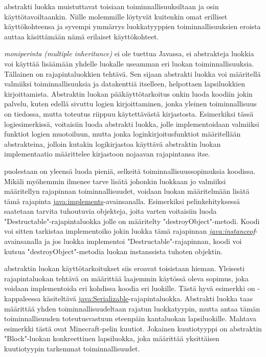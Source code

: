 \documentclass{tufte-book}
\newcommand{\eng}[1]{\textit{(#1)}}
\newcommand{\new}[1]{\textit{\gls{#1}}}
\newcommand{\neweng}[2]{\new{#1} \eng{#2}}
\newcommand{\java}[1]{\underline{\gls{java:#1}}}
\newcommand{\newjava}[1]{\textit{\java{#1}}}
\begin{document}
 abstrakti luokka muistuttavat toisiaan toiminnallisuuksiltaan ja
osin käyttötavoiltaankin. Niille molemmille löytyvät kuitenkin omat erilliset käyttökohteensa ja
syvempi ymmärrys luokkatyyppien toiminnallisuuksien eroista auttaa käsittämään nämä erilaiset
käyttökohteet.

 \neweng{moniperinta}{multiple inheritance} ei ole tuettua Javassa, ei
abstrakteja luokkia voi käyttää lisäämään yhdelle luokalle useamman eri luokan toiminnallisuuksia.
Tällainen on rajapintaluokkien tehtävä. Sen sijaan abstrakti luokka voi määritellä valmiiksi
toiminnallisuuksia ja datakenttiä itselleen, helpottaen lapsiluokkien kirjoittamista. Abstraktin
luokan pääkäyttötarkoitus onkin luoda koodiin jokin palvelu, kuten edellä sivuttu logien	
kirjoittaminen, jonka yleinen toiminnallisuus on tiedossa, mutta toteutus riippuu käytettävästä
kirjastosta. Esimerkiksi tässä logiesimerkissä, voitaisiin luoda abstrakti luokka, jolle
implementoidaan valmiiksi funktiot logien muotoiluun, mutta jonka loginkirjoitusfunktiot
määritellään abstrakteina, jolloin kutakin logikirjastoa käyttävä abstraktin luokan implementaatio
määrittelee kirjastoon nojaavan rajapintansa itse.

 puolestaan on yleensä luoda pieniä, selkeitä
toiminnallisuussopimuksia koodissa. Mikäli myöhemmin ilmenee tarve lisätä johonkin luokkaan jo
valmiiksi määritellyn rajapinnan toiminnallisuudet, voidaan luokan määritelmään lisätä tämä
rajapinta \java{implements}-avainsanalla. Esimerkiksi pelinkehityksessä saatetaan tarvita
tuhoutuvia objekteja, joita varten voitaisiin luoda "Destructable"-rajapintaluokka jolle on
määritelty "destroyObject"-metodi. Koodi voi sitten tarkistaa implementoiko jokin luokka tämä
rajapinnan \newjava{instanceof}-avainsanalla ja jos luokka implementoi "Destructable"-rajapinnan,
koodi voi kutsua "destroyObject"-metodia luokan instanssista tuhoten objektin.

 abstraktin luokan käyttötarkoitukset siis eroavat toisistaan
hieman. Yleisesti rajapintaluokan tehtävä on määrittää laajemmin käytössä oleva sopimus, joka
voidaan implementoida eri kohdissa koodia eri luokille. Tästä hyvä esimerkki on
-kappaleessa käsiteltävä \java{Serializable}-rajapintaluokka. Abstrakti
luokka taas määrittää yhden toiminnallisuudeltaan rajatun luokkatyypin, mutta antaa tämän
toiminnallisuuden toteutusvastuun eteenpäin kantaluokan lapsiluokille. Mahtava esimerkki tästä
ovat Minecraft-pelin kuutiot. Jokainen kuutiotyyppi on abstraktin "Block"-luokan konkreettinen
lapsiluokka, joka määrittää yksittäisen kuutiotyypin tarkemmat toiminnallisuudet.
\end{document}
